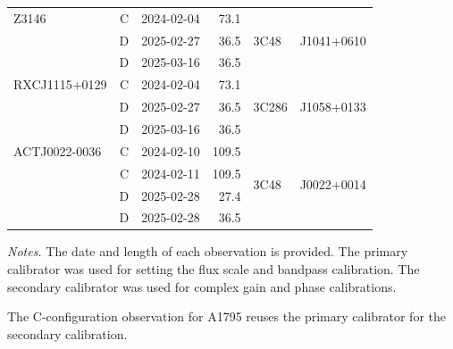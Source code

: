 \begin{table}[p]
\begin{threeparttable}
\begin{tabular}{@{}l c l r l l@{}}
                Z3146         & C & 2024-02-04 & 73.1  & \multirow{3}{*}{3C48}  & \multirow{3}{*}{J1041+0610} \\
                            & D & 2025-02-27 & 36.5  &                        &                             \\
                            & D & 2025-03-16 & 36.5  &                        &                             \\
                \addlinespace[0.25em]

                RXCJ1115+0129 & C & 2024-02-04 & 73.1  & \multirow{3}{*}{3C286} & \multirow{3}{*}{J1058+0133} \\
                            & D & 2025-02-27 & 36.5  &                        &                             \\
                            & D & 2025-03-16 & 36.5  &                        &                             \\
                \addlinespace[0.25em]

                ACTJ0022-0036 & C & 2024-02-10 & 109.5 & \multirow{4}{*}{3C48}  & \multirow{4}{*}{J0022+0014} \\
                            & C & 2024-02-11 & 109.5 &                        &                             \\
                            & D & 2025-02-28 & 27.4  &                        &                             \\
                            & D & 2025-02-28 & 36.5  &                        &                             \\

                \bottomrule
            \end{tabular}

            \begin{tablenotes}[flushleft]
                \footnotesize
                \item \textit{Notes.} The date and length of each observation is provided. The primary calibrator was used for setting the flux scale and bandpass calibration. The secondary calibrator was used for complex gain and phase calibrations.
                \item[a] The C-configuration observation for A1795 reuses the primary calibrator for the secondary calibration.
            \end{tablenotes}

        \end{threeparttable}
    \endgroup
\end{table}

